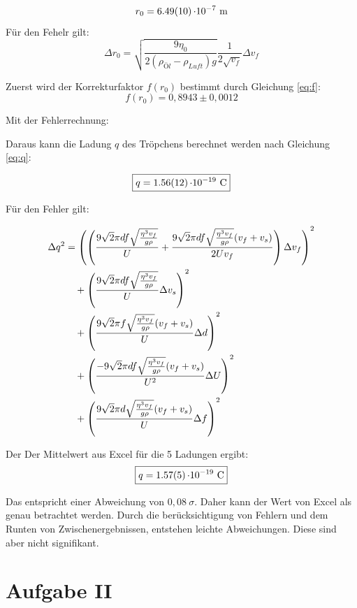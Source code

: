 \[r_0 = \SI{6,49 \pm 0,10}{\cdot 10^{-7}\ \meter} \]
Für den Fehelr gilt:
\begin{equation}
    \Delta r_0 = \sqrt{\frac{9 \eta_0}{2 (\rho_{Öl}- \rho_{Luft}) g}} \frac{1}{2 \sqrt{v_f}}\Delta v_f
\end{equation}

Zuerst wird der Korrekturfaktor $f(r_0)$ bestimmt durch Gleichung \ref{eq:f}:
\[f(r_0) = 0,8943 \pm 0,0012\]

Mit der Fehlerrechnung:

Daraus kann die Ladung $q$ des Tröpchens berechnet werden nach Gleichung \ref{eq:q}:

\[\boxed{q = \SI{1,56 \pm 0.12}{\cdot 10^{-19}\ \coulomb}}\]

Für den Fehler gilt:


\begin{align}
\Delta q^2 &= \left( \left(\frac{9\sqrt{2}\pi df \sqrt{\frac{\eta^{3}v_f}{g\rho}}}{U} + \frac{9\sqrt{2}\pi df \sqrt{\frac{\eta^{3}v_f}{g\rho}} (v_f+v_s)}{2U v_f}\right) \Delta v_f\right)^2 \notag\\ 
&\quad + \left(\frac{9\sqrt{2}\pi df \sqrt{\frac{\eta^{3}v_f}{g\rho}}}{U} \Delta v_s\right)^2 \notag\\
&\quad + \left(\frac{9\sqrt{2}\pi f \sqrt{\frac{\eta^{3}v_f}{g\rho}} (v_f+v_s)}{U} \Delta d\right)^2 \notag\\
&\quad + \left(\frac{-9\sqrt{2}\pi df \sqrt{\frac{\eta^{3}v_f}{g\rho}} (v_f+v_s)}{U^2} \Delta U\right)^2 \notag\\
&\quad + \left(\frac{9\sqrt{2}\pi d \sqrt{\frac{\eta^{3}v_f}{g\rho}} (v_f+v_s)}{U} \Delta f\right)^2
\end{align}

Der Der Mittelwert aus Excel für die 5 Ladungen ergibt:
\[\boxed{q = \SI{1,57 \pm0,05}{\cdot 10^{-19}\ \coulomb}}\]

Das entspricht einer Abweichung von $0,08\ \sigma$. Daher kann der Wert von Excel als genau betrachtet werden.
Durch die berücksichtigung von Fehlern und dem Runten von Zwischenergebnissen, entstehen leichte Abweichungen.
Diese sind aber nicht signifikant.

\newpage
\section{Aufgabe II}

